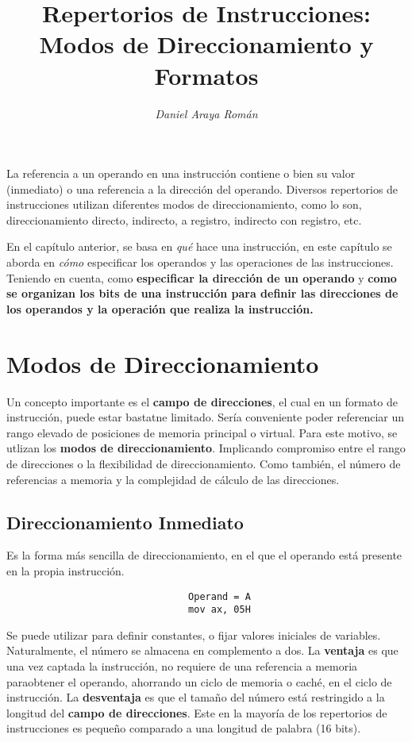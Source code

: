 \documentclass{article}
\title{\LARGE\textbf{Repertorios de Instrucciones: \\ 
                     Modos de Direccionamiento y Formatos}}
\author{\large\textit{Daniel Araya Román}}
\date{}
\begin{document}
\maketitle

La referencia a un operando en una instrucci\'{o}n contiene o bien
su valor (inmediato) o una referencia a la direcci\'{o}n del operando.
Diversos repertorios de instrucciones utilizan diferentes modos de
direccionamiento, como lo son, direccionamiento directo, indirecto,
a registro, indirecto con registro, etc.

En el cap\'{i}tulo anterior, se basa en \textit{qu\'{e}} hace una instrucci\'{o}n,
en este cap\'{i}tulo se aborda en \textit{c\'{o}mo} especificar los operandos
y las operaciones de las instrucciones. Teniendo en cuenta, como
\textbf{especificar la direcci\'{o}n de un operando} y
\textbf{como se organizan los bits de una instrucci\'{o}n para definir
las direcciones de los operandos y la operaci\'{o}n que realiza la
instrucci\'{o}n.} \cite{stallings2006organización}

\section*{Modos de Direccionamiento}
Un concepto importante es el \textbf{campo de direcciones}, el cual
en un formato de instrucci\'{o}n, puede estar bastatne limitado. Ser\'{i}a
conveniente poder referenciar un rango elevado de posiciones de memoria
principal o virtual. Para este motivo, se utlizan los \textbf{modos de
    direccionamiento}. Implicando compromiso entre el rango de direcciones o
la flexibilidad de direccionamiento. Como tambi\'{e}n, el n\'{u}mero de
referencias a memoria y la complejidad  de c\'{a}lculo de las direcciones.

\subsection*{Direccionamiento Inmediato}
Es la forma m\'{a}s sencilla de direccionamiento, en el que el operando est\'{a}
presente en la propia instrucci\'{o}n.
\begin{verbatim}
                                Operand = A
                                mov ax, 05H
\end{verbatim}

Se puede utilizar para definir constantes, o fijar valores iniciales de variables.
Naturalmente, el n\'{u}mero se almacena en complemento a dos. La \textbf{ventaja}
es que una vez captada la instrucci\'{o}n, no requiere de una referencia a
memoria paraobtener el operando, ahorrando un ciclo de memoria o cach\'{e},
en el ciclo de instrucci\'{o}n. La \textbf{desventaja} es que el tama\~{n}o
del n\'{u}mero est\'{a} restringido a la longitud del
\textbf{campo de direcciones}. Este en la mayor\'{i}a de los repertorios de
instrucciones es peque\~{n}o comparado a una longitud de palabra (16 bits).
\end{document}
